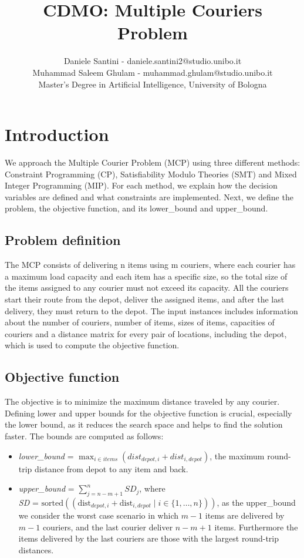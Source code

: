 \documentclass{article}
\title{CDMO: Multiple Couriers Problem}
\author{
Daniele Santini - daniele.santini2@studio.unibo.it\\
Muhammad Saleem Ghulam - muhammad.ghulam@studio.unibo.it\\
Master's Degree in Artificial Intelligence, University of Bologna\\
}
\date{}  %
\begin{document}
\maketitle{}

\section{Introduction}
We approach the Multiple Courier Problem (MCP) using three different methods: Constraint Programming (CP), Satisfiability Modulo Theories (SMT) and Mixed Integer Programming (MIP). For each method, we explain how the decision variables are defined and what constraints are implemented. Next, we define the problem, the objective function, and its lower\_bound and upper\_bound.
\subsection{Problem definition}
The MCP consists of delivering n items using m couriers, where each courier has a maximum load capacity and each item has a specific size, so the total size of the items assigned to any courier must not exceed its capacity. All the couriers start their route from the depot, deliver the assigned items, and after the last delivery, they must return to the depot.
The input instances includes information about the number of couriers, number of items, sizes of items, capacities of couriers and a distance matrix for every pair of locations, including the depot, which is used to compute the objective function.
\subsection{Objective function}
The objective is to minimize the maximum distance traveled by any courier. Defining lower and upper bounds for the objective function is crucial, especially the lower bound, as it reduces the search space and helps to find the solution faster. The bounds are computed as follows:
\begin{itemize}
    \item 
\textit{lower\_bound} = $\max_{i \in items} \left( dist_{depot,i} + dist_{i,depot}\right)$, the maximum round-trip distance from depot to any item and back. 
   \item 
\textit{upper\_bound} = $\sum_{j=n-m+1}^{n}SD_j$, where \\ \textit{SD} = $\text{sorted} \left( \left( \text{dist}_{depot,i} + \text{dist}_{i,depot} \mid i \in \{1, \ldots, n\} \right) \right)$, as the upper\_bound we consider the worst case scenario in which $m-1$ items are delivered by $m-1$ couriers, and the last courier deliver $n-m+1$ items. Furthermore the items delivered by the last couriers are those with the largest round-trip distances.
\end{itemize}
\end{document}
